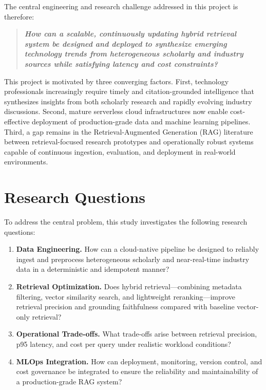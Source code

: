 \documentclass[12pt,a4paper]{report}
\begin{document}
The central engineering and research challenge addressed in this project is therefore:

\begin{quote}
\textbf{\textit{How can a scalable, continuously updating hybrid retrieval system be designed and deployed to synthesize emerging technology trends from heterogeneous scholarly and industry sources while satisfying latency and cost constraints?}}
\end{quote}

This project is motivated by three converging factors. First, technology professionals increasingly require timely and citation-grounded intelligence that synthesizes insights from both scholarly research and rapidly evolving industry discussions. Second, mature serverless cloud infrastructures now enable cost-effective deployment of production-grade data and machine learning pipelines. Third, a gap remains in the Retrieval-Augmented Generation (RAG) literature between retrieval-focused research prototypes and operationally robust systems capable of continuous ingestion, evaluation, and deployment in real-world environments.

\section{Research Questions}
\label{sec:rq}

To address the central problem, this study investigates the following research questions:

\begin{enumerate}[leftmargin=0.5in]
  \item \textbf{Data Engineering.} How can a cloud-native pipeline be designed to reliably ingest and preprocess heterogeneous scholarly and near-real-time industry data in a deterministic and idempotent manner?

  \item \textbf{Retrieval Optimization.} Does hybrid retrieval---combining metadata filtering, vector similarity search, and lightweight reranking---improve retrieval precision and grounding faithfulness compared with baseline vector-only retrieval?

  \item \textbf{Operational Trade-offs.} What trade-offs arise between retrieval precision, p95 latency, and cost per query under realistic workload conditions?

  \item \textbf{MLOps Integration.} How can deployment, monitoring, version control, and cost governance be integrated to ensure the reliability and maintainability of a production-grade RAG system?
\end{enumerate}
\end{document}
